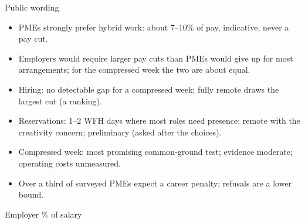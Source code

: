 \begin{frame}[t,label=B-language]{Public wording}
  \FrameTop
  \begin{itemize}\setlength{\itemsep}{0.02cm}
    \item PMEs strongly prefer hybrid work: about 7--10\% of pay, indicative, never a pay cut.
    \item Employers would require larger pay cuts than PMEs would give up for most arrangements; for the compressed week the two are about equal.
    \item Hiring: no detectable gap for a compressed week; fully remote draws the largest cut (a ranking).
    \item Reservations: 1--2 WFH days where most roles need presence; remote with the creativity concern; preliminary (asked after the choices).
    \item Compressed week: most promising common-ground test; evidence moderate; operating costs unmeasured.
    \item Over a third of surveyed PMEs expect a career penalty; refusals are a lower bound.
  \end{itemize}
  \vspace{0.06cm}
\end{frame}

\begin{frame}[t,label=B-org-pct]{Employer \% of salary}
  \FrameTop %
  {\centering{}}
\end{frame}

